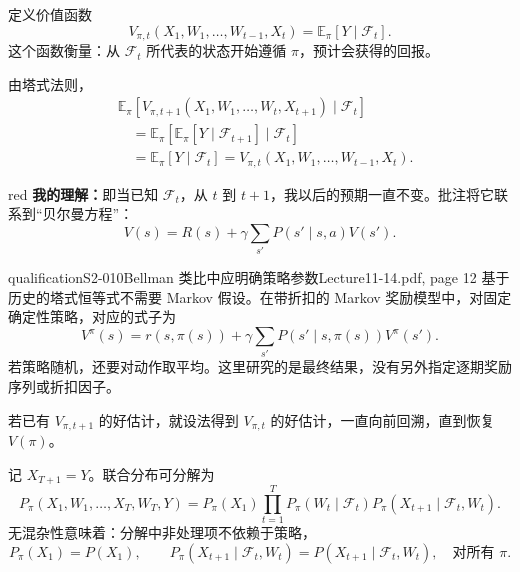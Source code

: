 定义价值函数
\[
 V_{\pi,t}(X_1,W_1,\ldots,W_{t-1},X_t)
 =\mathbb E_\pi[Y\mid\mathcal F_t].
\]
这个函数衡量：从 $\mathcal F_t$ 所代表的状态开始遵循 $\pi$，预计会获得的回报。

由塔式法则，
\begin{align*}
 &\mathbb E_\pi[V_{\pi,t+1}(X_1,W_1,\ldots,W_t,X_{t+1})\mid\mathcal F_t]\\
 &\quad=\mathbb E_\pi[\mathbb E_\pi[Y\mid\mathcal F_{t+1}]\mid\mathcal F_t]\\
 &\quad=\mathbb E_\pi[Y\mid\mathcal F_t]
 =V_{\pi,t}(X_1,W_1,\ldots,W_{t-1},X_t).\tag{12.6}
\end{align*}
\begin{inkblock}{red}
\textbf{我的理解：}即当已知 $\mathcal F_t$，从 $t$ 到 $t+1$，我以后的预期一直不变。批注将它联系到“贝尔曼方程”：
\[
 V(s)=R(s)+\gamma\sum_{s'}P(s'\mid s,a)V(s').
\]

\end{inkblock}

\begin{reviewnote}{qualification}{S2-010}{Bellman 类比中应明确策略参数}{Lecture11-14.pdf, page 12}
基于历史的塔式恒等式不需要 Markov 假设。在带折扣的 Markov 奖励模型中，对固定确定性策略，对应的式子为
\[
 V^\pi(s)=r(s,\pi(s))+\gamma\sum_{s'}P(s'\mid s,\pi(s))V^\pi(s').
\]
若策略随机，还要对动作取平均。这里研究的是最终结果，没有另外指定逐期奖励序列或折扣因子。
\end{reviewnote}

若已有 $V_{\pi,t+1}$ 的好估计，就设法得到 $V_{\pi,t}$ 的好估计，一直向前回溯，直到恢复 $V(\pi)$。

记 $X_{T+1}=Y$。联合分布可分解为
\[
 P_\pi(X_1,W_1,\ldots,X_T,W_T,Y)
 =P_\pi(X_1)\prod_{t=1}^T
 P_\pi(W_t\mid\mathcal F_t)
 P_\pi(X_{t+1}\mid\mathcal F_t,W_t).
\]
无混杂性意味着：分解中非处理项不依赖于策略，
\[
 P_\pi(X_1)=P(X_1),\qquad
 P_\pi(X_{t+1}\mid\mathcal F_t,W_t)
 =P(X_{t+1}\mid\mathcal F_t,W_t),\quad\text{对所有 }\pi.
\]

